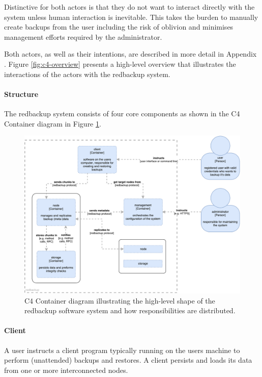 Distinctive for both actors is that they do not want to interact directly with the system unless human interaction is inevitable. This takes the burden to manually create backups from the user including the risk of oblivion and minimises \gls{management} efforts required by the administrator.  

Both actors, as well as their intentions, are described in more detail in Appendix . Figure \ref{fig:c4-overview} presents a high-level overview that illustrates the interactions of the actors with the redbackup system.

\paragraph{Structure}
The redbackup system consists of four core components as shown in the C4 Container diagram in Figure \ref{fig:c4-container}.

\begin{figure}[h]
	\centering
	\includegraphics[width=1\linewidth]{resources/c4-container}
	\caption[C4 Container diagram]{C4 Container diagram illustrating the high-level shape of the redbackup software system and how responsibilities are distributed.}
	\label{fig:c4-container}
\end{figure}

\paragraph{Client} A \gls{user} instructs a \gls{client} program typically running on the users machine to perform (unattended) backups and restores.  A \gls{client} persists and loads its data from one or more interconnected \glspl{node}.

